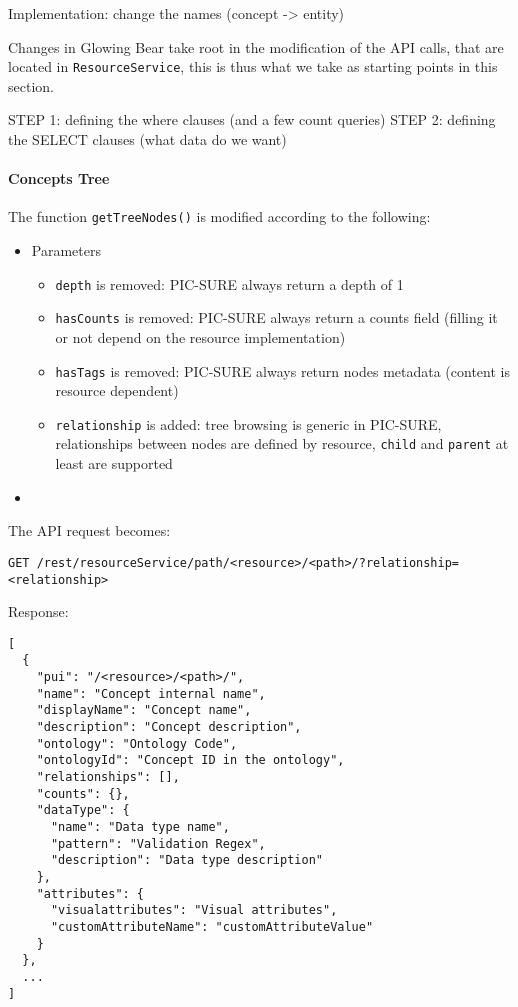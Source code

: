 Implementation: change the names (concept -> entity)

Changes in Glowing Bear take root in the modification of the API calls, that are located in \verb|ResourceService|, this is thus what we take as starting points in this section. 

STEP 1: defining the where clauses (and a few count queries)
STEP 2: defining the SELECT clauses (what data do we want)



\paragraph{Concepts Tree}

The function \verb|getTreeNodes()| is modified according to the following:
\begin{itemize}
    \item Parameters
    \begin{itemize}
        \item \verb|depth| is removed: PIC-SURE always return a depth of 1
        \item \verb|hasCounts| is removed: PIC-SURE always return a counts field (filling it or not depend on the resource implementation)
        \item \verb|hasTags| is removed: PIC-SURE always return nodes metadata (content is resource dependent)
        \item \verb|relationship| is added: tree browsing is generic in PIC-SURE, relationships between nodes are defined by resource, \verb|child| and \verb|parent| at least are supported
    \end{itemize}
    \item 
\end{itemize}

The API request becomes:
\begin{verbatim}
GET /rest/resourceService/path/<resource>/<path>/?relationship=<relationship>
\end{verbatim}

Response:
\begin{verbatim}
[
  {
    "pui": "/<resource>/<path>/",
    "name": "Concept internal name",
    "displayName": "Concept name",
    "description": "Concept description",
    "ontology": "Ontology Code",
    "ontologyId": "Concept ID in the ontology",
    "relationships": [],
    "counts": {},
    "dataType": {
      "name": "Data type name",
      "pattern": "Validation Regex",
      "description": "Data type description"
    },
    "attributes": {
      "visualattributes": "Visual attributes",
      "customAttributeName": "customAttributeValue"
    }
  },
  ...
]
\end{verbatim}

